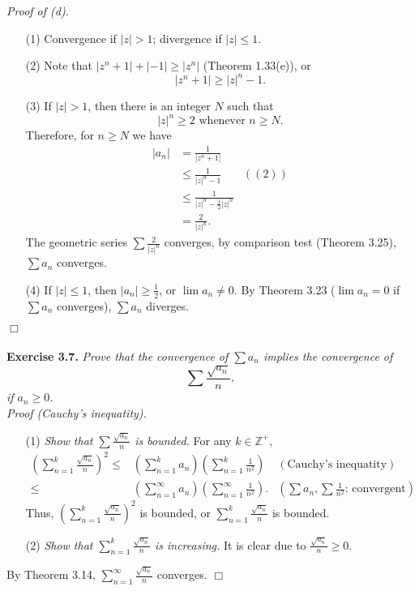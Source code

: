 \documentclass{article}
\begin{document}
\emph{Proof of (d).}
\begin{enumerate}
\item[(1)]
Convergence if $|z| > 1$; divergence if $|z| \leq 1$.
\item[(2)]
Note that
$|z^n+1| + |-1| \geq |z^n|$
(Theorem 1.33(e)),
or
$$|z^n+1| \geq |z|^n - 1.$$
\item[(3)]
If $|z| > 1$, then there is an integer $N$ such that
$$|z|^n \geq 2 \text{ whenever } n \geq N.$$
Therefore, for $n \geq N$ we have
  \begin{align*}
    |a_n|
    &= \frac{1}{|z^n+1|} \\
    &\leq \frac{1}{|z|^n - 1}
      &((2)) \\
    &\leq \frac{1}{|z|^n - \frac{1}{2}|z|^n} \\
    &= \frac{2}{|z|^n}.
  \end{align*}
The geometric series $\sum \frac{2}{|z|^n}$ converges,
by comparison test (Theorem 3.25), $\sum a_n$ converges.
\item[(4)]
If $|z| \leq 1$, then $|a_n| \geq \frac{1}{2}$,
or $\lim a_n \neq 0$.
By Theorem 3.23 ($\lim a_n = 0$ if $\sum a_n$ converges),
$\sum a_n$ diverges.
\end{enumerate}
$\Box$ \\\\






\textbf{Exercise 3.7.}
\emph{Prove that the convergence of $\sum a_n$ implies the convergence of
$$\sum \frac{\sqrt{a_n}}{n},$$
if $a_n \geq 0$.} \\

\emph{Proof (Cauchy's inequatity).}
\begin{enumerate}
\item[(1)]
\emph{Show that $\sum\frac{\sqrt{a_n}}{n}$ is bounded.}
For any $k \in \mathbb{Z}^{+}$,
\begin{align*}
\left( \sum_{n=1}^{k} \frac{\sqrt{a_n}}{n} \right)^2
\leq&
\left( \sum_{n=1}^{k}{a_n} \right)
\left( \sum_{n=1}^{k}{\frac{1}{n^2}} \right)
  &(\text{Cauchy's inequatity}) \\
\leq& \left( \sum^{\infty}_{n=1}{a_n} \right)
\left( \sum^{\infty}_{n=1}{\frac{1}{n^2}} \right).
  &\left(\text{$\sum{a_n}, \sum{\frac{1}{n^2}}$: convergent}\right)
\end{align*}
Thus,
$\left( \sum_{n=1}^{k}\frac{\sqrt{a_n}}{n} \right)^2$ is bounded,
or $\sum_{n=1}^{k}\frac{\sqrt{a_n}}{n}$ is bounded.
\item[(2)]
\emph{Show that $\sum_{n=1}^{k} \frac{\sqrt{a_n}}{n}$ is increasing.}
It is clear due to $\frac{\sqrt{a_n}}{n} \geq 0$.
\end{enumerate}
By Theorem 3.14, $\sum_{n=1}^{\infty} \frac{\sqrt{a_n}}{n}$ converges.
$\Box$ \\
\end{document}
